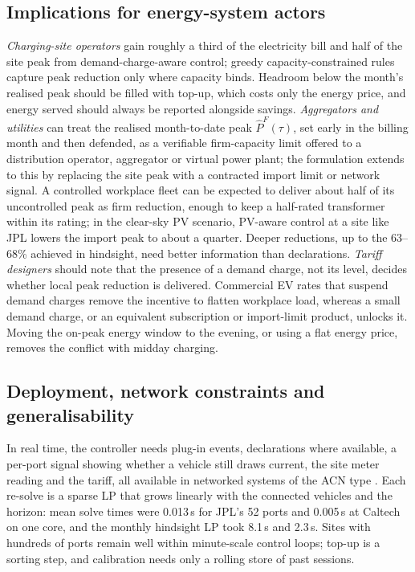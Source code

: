 \subsection{Implications for energy-system actors}
\emph{Charging-site operators} gain roughly a third of the electricity bill and half of the site peak from demand-charge-aware control; greedy capacity-constrained rules capture peak reduction only where capacity binds. Headroom below the month's realised peak should be filled with top-up, which costs only the energy price, and energy served should always be reported alongside savings.
\emph{Aggregators and utilities} can treat the realised month-to-date peak $\hat P^F(\tau)$, set early in the billing month and then defended, as a verifiable firm-capacity limit offered to a distribution operator, aggregator or virtual power plant; the formulation extends to this by replacing the site peak with a contracted import limit or network signal. A controlled workplace fleet can be expected to deliver about half of its uncontrolled peak as firm reduction, enough to keep a half-rated transformer within its rating; in the clear-sky PV scenario, PV-aware control at a site like JPL lowers the import peak to about a quarter. Deeper reductions, up to the 63--68\% achieved in hindsight, need better information than declarations.
\emph{Tariff designers} should note that the presence of a demand charge, not its level, decides whether local peak reduction is delivered. Commercial EV rates that suspend demand charges \cite{CPUCEVRates} remove the incentive to flatten workplace load, whereas a small demand charge, or an equivalent subscription or import-limit product, unlocks it. Moving the on-peak energy window to the evening, or using a flat energy price, removes the conflict with midday charging.

\subsection{Deployment, network constraints and generalisability}
In real time, the controller needs plug-in events, declarations where available, a per-port signal showing whether a vehicle still draws current, the site meter reading and the tariff, all available in networked systems of the ACN type \cite{Lee2021ACN}. Each re-solve is a sparse LP that grows linearly with the connected vehicles and the horizon: mean solve times were 0.013\,s for JPL's 52 ports and 0.005\,s at Caltech on one core, and the monthly hindsight LP took 8.1\,s and 2.3\,s. Sites with hundreds of ports remain well within minute-scale control loops; top-up is a sorting step, and calibration needs only a rolling store of past sessions.

